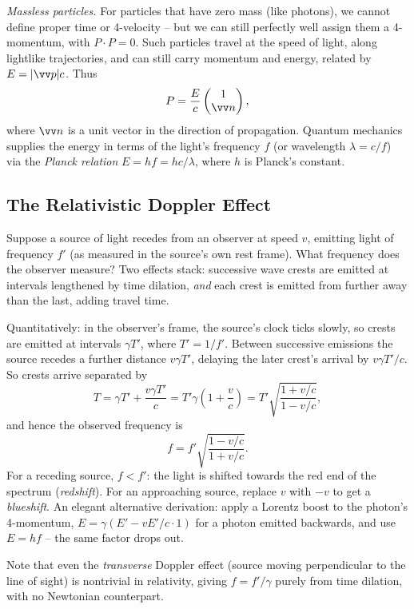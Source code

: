 \emph{Massless particles.} For particles that have zero mass (like photons), we cannot define proper time or 4-velocity -- but we can still perfectly well assign them a 4-momentum, with $P \cdot P = 0$. Such particles travel at the speed of light, along lightlike trajectories, and can still carry momentum and energy, related by $E = |\vv p| c$. Thus
$$
P = \frac{E}{c} \begin{pmatrix}
	1 \\ \vv n
\end{pmatrix},
$$
where $\vv n$ is a unit vector in the direction of propagation. Quantum mechanics supplies the energy in terms of the light's frequency $f$ (or wavelength $\lambda = c/f$) via the \emph{Planck relation} $E = hf = hc/\lambda$, where $h$ is Planck's constant.

\subsection{The Relativistic Doppler Effect}

Suppose a source of light recedes from an observer at speed $v$, emitting light of frequency $f'$ (as measured in the source's own rest frame). What frequency does the observer measure? Two effects stack: successive wave crests are emitted at intervals lengthened by time dilation, \emph{and} each crest is emitted from further away than the last, adding travel time.

Quantitatively: in the observer's frame, the source's clock ticks slowly, so crests are emitted at intervals $\gamma T'$, where $T' = 1/f'$. Between successive emissions the source recedes a further distance $v \gamma T'$, delaying the later crest's arrival by $v\gamma T'/c$. So crests arrive separated by
$$
T = \gamma T' + \frac{v \gamma T'}{c} = T' \gamma\left(1 + \frac{v}{c}\right) = T'\sqrt{\frac{1 + v/c}{1 - v/c}},
$$
and hence the observed frequency is
$$
f = f' \sqrt{\frac{1 - v/c}{1 + v/c}}.
$$
For a receding source, $f < f'$: the light is shifted towards the red end of the spectrum (\emph{redshift}). For an approaching source, replace $v$ with $-v$ to get a \emph{blueshift}. An elegant alternative derivation: apply a Lorentz boost to the photon's 4-momentum, $E = \gamma(E' - vE'/c \cdot 1)$ for a photon emitted backwards, and use $E = hf$ -- the same factor drops out.

Note that even the \emph{transverse} Doppler effect (source moving perpendicular to the line of sight) is nontrivial in relativity, giving $f = f'/\gamma$ purely from time dilation, with no Newtonian counterpart.

